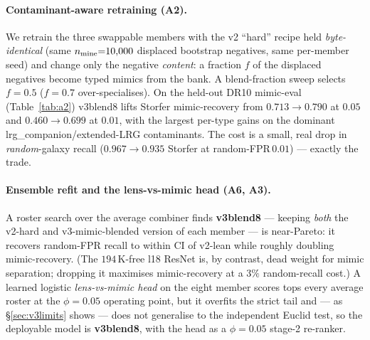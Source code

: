 \paragraph{Contaminant-aware retraining (A2).} We retrain the three swappable members with the
v2 ``hard'' recipe held \emph{byte-identical} (same $n_{\rm mine}{=}10{,}000$ displaced bootstrap
negatives, same per-member seed) and change only the negative \emph{content}: a fraction $f$ of the
displaced negatives become typed mimics from the bank. A blend-fraction sweep selects $f{=}0.5$
($f{=}0.7$ over-specialises). On the held-out DR10 mimic-eval (Table~\ref{tab:a2}) v3blend8 lifts
Storfer mimic-recovery from $0.713\!\to\!0.790$ at $0.05$ and $0.460\!\to\!0.699$ at $0.01$, with
the largest per-type gains on the dominant lrg\_companion/extended-LRG contaminants. The cost is a
small, real drop in \emph{random}-galaxy recall ($0.967\!\to\!0.935$ Storfer at random-FPR$\,0.01$)
--- exactly the \citet{staf327} trade.

\paragraph{Ensemble refit and the lens-vs-mimic head (A6, A3).} A roster search over the average
combiner finds \textbf{v3blend8} --- keeping \emph{both} the v2-hard and v3-mimic-blended version
of each member --- is near-Pareto: it recovers random-FPR recall to within CI of v2-lean while
roughly doubling mimic-recovery. (The $194$\,K-free l18 ResNet is, by contrast, dead weight for
mimic separation; dropping it maximises mimic-recovery at a $3\%$ random-recall cost.) A learned
logistic \emph{lens-vs-mimic head} on the eight member scores tops every average roster at the
$\phi{=}0.05$ operating point, but it overfits the strict tail and --- as \S\ref{sec:v3limits}
shows --- does not generalise to the independent Euclid test, so the deployable model is
\textbf{v3blend8}, with the head as a $\phi{=}0.05$ stage-2 re-ranker.



